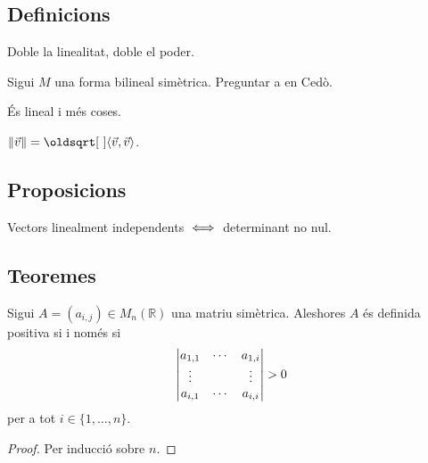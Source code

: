 \documentclass[../../Main.tex]{subfiles}
\begin{document}
	\subsection{Definicions}
	\begin{definition}
		\label{def:forma bilineal}
		Doble la linealitat, doble el poder.
	\end{definition}
	\begin{definition}
		\label{def:bilineal definida estrictament positiva/negativa}
		Sigui \(M\) una forma bilineal simètrica. Preguntar a en Cedò.
	\end{definition}
	\begin{definition}
		\label{def:Norma d'una aplicació lineal}
	\end{definition}
	\begin{definition}
		\label{def:producte escalar}
		És lineal i més coses.
	\end{definition}
	\begin{definition}
		\label{def:norma d'un vector}
		\(\norm{\vec{v}}=\sqrt{\prodesc{\vec{v}}{\vec{v}}}\).
	\end{definition}
	\begin{definition}
		\label{def:dependència lineal}
		\label{def:vectors linealment dependents}
	\end{definition}
	\subsection{Proposicions}
	\begin{proposition}
		\label{prop:determinant diferent de zero linealment independents}
		Vectors linealment independents \(\iff\) determinant no nul.
	\end{proposition}
	\subsection{Teoremes}
	\begin{theorem}
		Sigui \(A=(a_{i,j})\in M_{n}(\mathbb{R})\) una matriu simètrica. Aleshores \(A\) és definida positiva si i només si
		\[\abs{\begin{matrix}
		a_{1,1}&\cdots&a_{1,i}\\
		\vdots&&\vdots\\
		a_{i,1}&\cdots&a_{i,i}\\
		\end{matrix}}>0\]
		per a tot \(i\in\{1,\dots,n\}\).
		\begin{proof}
			Per inducció sobre \(n\).
		\end{proof}
	\end{theorem}
\end{document}

